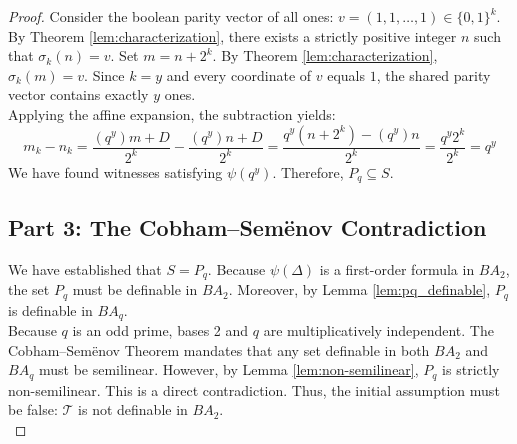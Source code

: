 \documentclass[11pt]{article}
\begin{document}
\begin{proof}
Consider the boolean parity vector of all ones: $v = (1, 1, \ldots, 1) \in \{0,1\}^k$. By Theorem \ref{lem:characterization}, there exists a strictly positive integer $n$ such that $\sigma_k(n) = v$. Set $m = n + 2^k$. By Theorem \ref{lem:characterization}, $\sigma_k(m) = v$. Since $k=y$ and every coordinate of $v$ equals $1$, the shared parity vector contains exactly $y$ ones.  \\

Applying the affine expansion, the subtraction yields:
$$ m_k - n_k = \frac{(q^y)m + D}{2^k} - \frac{(q^y)n + D}{2^k} = \frac{q^y (n + 2^k) - (q^y)n}{2^k} = \frac{q^y 2^k}{2^k} = q^y $$
We have found witnesses satisfying $\psi(q^y)$. Therefore, $P_q \subseteq S$. \\

\subsection*{Part 3: The Cobham--Sem\"enov Contradiction}

We have established that $S = P_q$. Because $\psi(\Delta)$ is a first-order formula in $BA_2$, the set $P_q$ must be definable in $BA_2$. Moreover, by Lemma \ref{lem:pq_definable}, $P_q$ is definable in $BA_q$. \\

Because $q$ is an odd prime, bases 2 and $q$ are multiplicatively independent. The Cobham--Sem\"enov Theorem mandates that any set definable in both $BA_2$ and $BA_q$ must be semilinear. However, by Lemma \ref{lem:non-semilinear}, $P_q$ is strictly non-semilinear. This is a direct contradiction. Thus, the initial assumption must be false: $\mathcal{T}$ is not definable in $BA_2$. \\
\end{proof}
\end{document}
